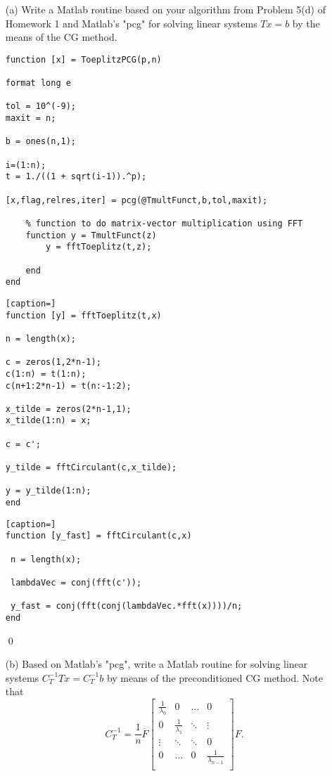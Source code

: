 \documentclass[12pt]{article}
\begin{document}
\begin{itemize}

\item[(a)]  Write a Matlab routine based on your algorithm from Problem 5(d) of Homework 1 and Matlab's "pcg" for solving linear systems $Tx = b$ by the means of the CG method.\\

\lstset{language=matlab,frame=single}
\begin{lstlisting}[caption= Function to Solve the Linear System \text{$Tx=b$,} for \text{$T$} Toeplitz]
function [x] = ToeplitzPCG(p,n)

format long e 

tol = 10^(-9);
maxit = n;

b = ones(n,1);

i=(1:n);
t = 1./((1 + sqrt(i-1)).^p);

[x,flag,relres,iter] = pcg(@TmultFunct,b,tol,maxit);

    % function to do matrix-vector multiplication using FFT
    function y = TmultFunct(z)
        y = fftToeplitz(t,z);
        
    end
end
\end{lstlisting}

\lstset{language=matlab,frame=single}
\begin{lstlisting}[caption=]
function [y] = fftToeplitz(t,x)

n = length(x);

c = zeros(1,2*n-1);
c(1:n) = t(1:n);
c(n+1:2*n-1) = t(n:-1:2);

x_tilde = zeros(2*n-1,1);
x_tilde(1:n) = x;

c = c';

y_tilde = fftCirculant(c,x_tilde);

y = y_tilde(1:n);
end
\end{lstlisting}

\newpage
\lstset{language=matlab,frame=single}
\begin{lstlisting}[caption=]
function [y_fast] = fftCirculant(c,x)

 n = length(x);
 
 lambdaVec = conj(fft(c'));
 
 y_fast = conj(fft(conj(lambdaVec.*fft(x))))/n;
end
\end{lstlisting}\qed\\


\item[(b)] Based on Matlab's "pcg", write a Matlab routine for solving linear systems $C_T^{-1}Tx = C_T^{-1}b$ by means of the preconditioned CG method.  Note that
$$C_T^{-1} = \frac{1}{n}\overline{F}\begin{bmatrix}
					\frac{1}{\lambda_0} & 0 & \hdots & 0 \\
					0 & 	\frac{1}{\lambda_1} & \ddots & \vdots \\
					\vdots & \ddots & \ddots & 0 \\
					0 & \hdots & 0 & \frac{1}{\lambda_{n-1}} \\
					\end{bmatrix}F.$$
					


\end{itemize}
\end{document}
